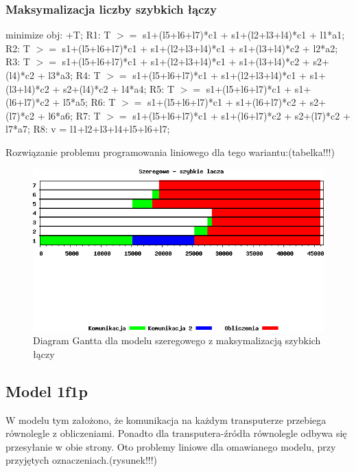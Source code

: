 \documentclass[a4paper,11pt, titlepage]{article}
\begin{document}
\subsubsection{Maksymalizacja liczby szybkich łączy}
\begin{flushleft}

minimize obj: +T;\linebreak
\linebreak
R1: T $>=$ s1+(l5+l6+l7)*c1 + s1+(l2+l3+l4)*c1 + l1*a1;\linebreak
R2: T $>=$ s1+(l5+l6+l7)*c1 + s1+(l2+l3+l4)*c1 + s1+(l3+l4)*c2 + l2*a2;\linebreak
R3: T $>=$ s1+(l5+l6+l7)*c1 + s1+(l2+l3+l4)*c1 + s1+(l3+l4)*c2 + s2+(l4)*c2 + l3*a3;\linebreak
R4: T $>=$ s1+(l5+l6+l7)*c1 + s1+(l2+l3+l4)*c1 + s1+(l3+l4)*c2 + s2+(l4)*c2 + l4*a4;\linebreak
R5: T $>=$ s1+(l5+l6+l7)*c1 + s1+(l6+l7)*c2 + l5*a5;\linebreak
R6: T $>=$ s1+(l5+l6+l7)*c1 + s1+(l6+l7)*c2 + s2+(l7)*c2 + l6*a6;\linebreak
R7: T $>=$ s1+(l5+l6+l7)*c1 + s1+(l6+l7)*c2 + s2+(l7)*c2 + l7*a7;\linebreak
R8: v = l1+l2+l3+l4+l5+l6+l7;\linebreak
\end{flushleft}

Rozwiązanie problemu programowania liniowego dla tego wariantu:(tabelka!!!)
\begin{figure}[h!]
\includegraphics[width=1.0\textwidth]{wykresy/szeregowe_lacza}
\caption{Diagram Gantta dla modelu szeregowego z maksymalizacją szybkich łączy \label{szeregowe_l}}
\end{figure}

\subsection{Model 1f1p}
W modelu tym założono, że komunikacja na każdym transputerze przebiega równolegle z obliczeniami. Ponadto dla transputera-źródła równolegle odbywa się przesyłanie w obie strony. Oto problemy liniowe dla omawianego modelu, przy przyjętych oznaczeniach.(rysunek!!!)
\end{document}
